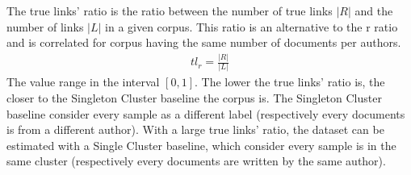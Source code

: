 \begin{definition}
  The true links' ratio is the ratio between the number of true links $|R|$ and the number of links $|L|$ in a given corpus.
  This ratio is an alternative to the r ratio and is correlated for corpus having the same number of documents per authors.
  \begin{gather*}
    tl_r = \frac{|R|}{|L|}
  \end{gather*}
  The value range in the interval $\left[0, 1\right]$.
  The lower the true links' ratio is, the closer to the Singleton Cluster baseline the corpus is.
  The Singleton Cluster baseline consider every sample as a different label (respectively every documents is from a different author).
  With a large true links' ratio, the dataset can be estimated with a Single Cluster baseline, which consider every sample is in the same cluster (respectively every documents are written by the same author).
\end{definition}
